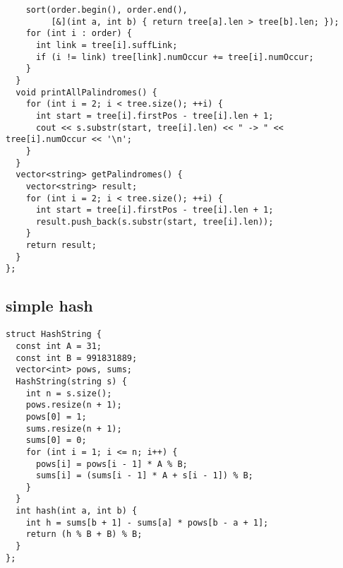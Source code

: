 \documentclass[twoside]{article}
\begin{document}
\begin{multicols*}{2}
\begin{verbatim}
    sort(order.begin(), order.end(),
         [&](int a, int b) { return tree[a].len > tree[b].len; });
    for (int i : order) {
      int link = tree[i].suffLink;
      if (i != link) tree[link].numOccur += tree[i].numOccur;
    }
  }
  void printAllPalindromes() {
    for (int i = 2; i < tree.size(); ++i) {
      int start = tree[i].firstPos - tree[i].len + 1;
      cout << s.substr(start, tree[i].len) << " -> " << tree[i].numOccur << '\n';
    }
  }
  vector<string> getPalindromes() {
    vector<string> result;
    for (int i = 2; i < tree.size(); ++i) {
      int start = tree[i].firstPos - tree[i].len + 1;
      result.push_back(s.substr(start, tree[i].len));
    }
    return result;
  }
};

\end{verbatim}

{
\subsection*{simple hash}
}
\begin{verbatim}
struct HashString {
  const int A = 31;
  const int B = 991831889;
  vector<int> pows, sums;
  HashString(string s) {
    int n = s.size();
    pows.resize(n + 1);
    pows[0] = 1;
    sums.resize(n + 1);
    sums[0] = 0;
    for (int i = 1; i <= n; i++) {
      pows[i] = pows[i - 1] * A % B;
      sums[i] = (sums[i - 1] * A + s[i - 1]) % B;
    }
  }
  int hash(int a, int b) {
    int h = sums[b + 1] - sums[a] * pows[b - a + 1];
    return (h % B + B) % B;
  }
};
\end{verbatim}

{
}
\end{multicols*}
\end{document}
